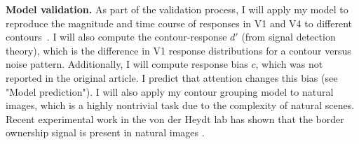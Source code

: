 \documentclass[11pt]{article}
\begin{document}
\textbf{Model validation.}  
As part of the validation process, I will apply my model to reproduce
the magnitude and 
time course of responses in V1 and V4 to different
contours~\citep{Chen_etal14}. I will also compute the contour-response
$d'$ (from signal detection theory), which is the difference in V1
response distributions for a contour versus noise
pattern. %
Additionally, I will compute response bias $c$, which was not reported
in the original \citep{Chen_etal14} article. I predict that attention
changes this bias 
(see "Model prediction").
I will also apply my contour grouping model to natural images, which
is a 
%
highly nontrivial task due to the complexity of natural scenes. Recent
experimental work in the von der Heydt lab has shown that the border
ownership signal is present in natural images
\citep{Williford_vonderHeydt14}.
\end{document}
